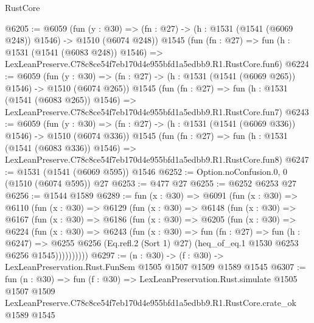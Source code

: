 \begin{lexlean}{RustCore}
\begin{coremodule}
@6205 := @6059
    (fun (y : @30) => (fn : @27) -> (h : @1531 (@1541 (@6069 @248)) @1546) -> @1510 (@6074 @248))
    @1545
    (fun (fn : @27) =>
    fun (h : @1531 (@1541 (@6083 @248)) @1546) =>
    LexLeanPreserve.C78c8ce54f7eb170d4e955bfd1a5edbb9.R1.RustCore.fun6)
@6224 := @6059
    (fun (y : @30) => (fn : @27) -> (h : @1531 (@1541 (@6069 @265)) @1546) -> @1510 (@6074 @265))
    @1545
    (fun (fn : @27) =>
    fun (h : @1531 (@1541 (@6083 @265)) @1546) =>
    LexLeanPreserve.C78c8ce54f7eb170d4e955bfd1a5edbb9.R1.RustCore.fun7)
@6243 := @6059
    (fun (y : @30) => (fn : @27) -> (h : @1531 (@1541 (@6069 @336)) @1546) -> @1510 (@6074 @336))
    @1545
    (fun (fn : @27) =>
    fun (h : @1531 (@1541 (@6083 @336)) @1546) =>
    LexLeanPreserve.C78c8ce54f7eb170d4e955bfd1a5edbb9.R1.RustCore.fun8)
@6247 := @1531 (@1541 (@6069 @595)) @1546
@6252 := Option.noConfusion.{0, 0} (@1510 (@6074 @595)) @27
@6253 := @477 @27
@6255 := @6252 @6253 @27
@6256 := @1544 @1589
@6289 := fun (x : @30) =>
  @6091
    (fun (x : @30) =>
    @6110
      (fun (x : @30) =>
      @6129
        (fun (x : @30) =>
        @6148
          (fun (x : @30) =>
          @6167
            (fun (x : @30) =>
            @6186
              (fun (x : @30) =>
              @6205
                (fun (x : @30) =>
                @6224
                  (fun (x : @30) =>
                  @6243
                    (fun (x : @30) =>
                    fun (fn : @27) =>
                    fun (h : @6247) =>
                    @6255
                      @6256
                      (Eq.refl.{2} (Sort 1) @27)
                      (heq_of_eq.{1} @1530 @6253 @6256 @1545))))))))))
@6297 := (n : @30) -> (f : @30) -> LexLeanPreservation.Rust.FunSem @1505 @1507 @1509 @1589 @1545
@6307 := fun (n : @30) =>
  fun (f : @30) =>
  LexLeanPreservation.Rust.simulate
    @1505
    @1507
    @1509
    LexLeanPreserve.C78c8ce54f7eb170d4e955bfd1a5edbb9.R1.RustCore.crate_ok
    @1589
    @1545
\end{coremodule}
\end{lexlean}
